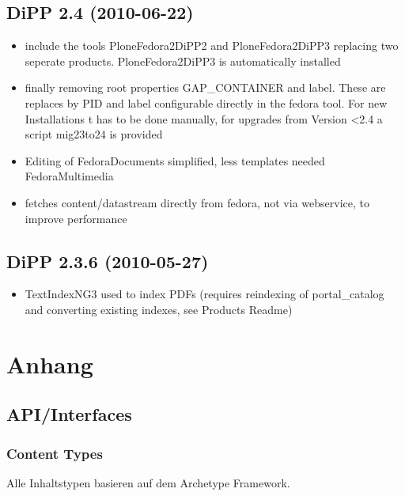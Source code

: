 \documentclass[a4paper,10pt,ngerman]{sphinxmanual}
\begin{document}
\section{DiPP 2.4 (2010-06-22)}
\label{changelog:dipp-2-4-2010-06-22}\begin{itemize}
\item {} 
include the tools PloneFedora2DiPP2 and PloneFedora2DiPP3 replacing
two seperate products. PloneFedora2DiPP3 is automatically installed

\item {} 
finally removing root properties GAP\_CONTAINER and label. These are
replaces by PID and label configurable directly in the fedora tool.  For new
Installations t has to be done manually, for upgrades from Version \textless{}2.4 a
script mig23to24 is provided

\item {} 
Editing of FedoraDocuments simplified, less templates needed FedoraMultimedia

\item {} 
fetches content/datastream directly from fedora, not
via webservice, to improve performance

\end{itemize}


\section{DiPP 2.3.6 (2010-05-27)}
\label{changelog:dipp-2-3-6-2010-05-27}\begin{itemize}
\item {} 
TextIndexNG3 used to index PDFs (requires reindexing of portal\_catalog
and converting existing indexes, see Products Readme)

\end{itemize}


\chapter{Anhang}
\label{anhang::doc}\label{anhang:anhang}

\section{API/Interfaces}
\label{api:api-interfaces}\label{api::doc}

\subsection{Content Types}
\label{contenttypen::doc}\label{contenttypen:content-types}
Alle Inhaltstypen basieren auf dem Archetype Framework.
\end{document}
